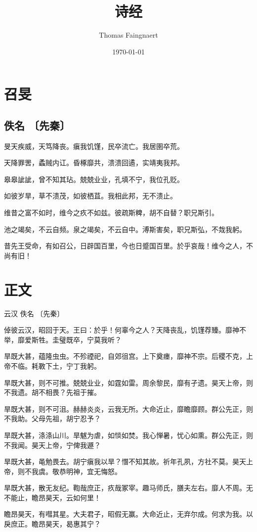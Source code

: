 \documentclass[a4paper,11pt]{article}
\title{诗经}
\author{Thomas Faingnaert}
\date{\today}
\begin{document}
\section{召旻}
\subsection{佚名 〔先秦〕}

		{\notosa 旻天疾威，天笃降丧。瘨我饥馑，民卒流亡。我居圉卒荒。}

		{\notosb 天降罪罟，蟊贼内讧。昏椓靡共，溃溃回遹，实靖夷我邦。}

		{\notosc 皋皋訿訿，曾不知其玷。兢兢业业，孔填不宁，我位孔贬。}

		{\notosd 如彼岁旱，草不溃茂，如彼栖苴。我相此邦，无不溃止。}

		{\notose 维昔之富不如时，维今之疚不如兹。彼疏斯粺，胡不自替？职兄斯引。}

		{\notosf 池之竭矣，不云自频。泉之竭矣，不云自中。溥斯害矣，职兄斯弘，不烖我躬。}

		{\notosg 昔先王受命，有如召公，日辟国百里，今也日蹙国百里。於乎哀哉！维今之人，不尚有旧！}

		\section{正文}

		云汉
		佚名 〔先秦〕

		倬彼云汉，昭回于天。王曰：於乎！何辜今之人？天降丧乱，饥馑荐臻。靡神不举，靡爱斯牲。圭璧既卒，宁莫我听？

		旱既大甚，蕴隆虫虫。不殄禋祀，自郊徂宫。上下奠瘗，靡神不宗。后稷不克，上帝不临。耗斁下土，宁丁我躬。

		旱既大甚，则不可推。兢兢业业，如霆如雷。周余黎民，靡有孑遗。昊天上帝，则不我遗。胡不相畏？先祖于摧。

		旱既大甚，则不可沮。赫赫炎炎，云我无所。大命近止，靡瞻靡顾。群公先正，则不我助。父母先祖，胡宁忍予？

		旱既大甚，涤涤山川。旱魃为虐，如惔如焚。我心惮暑，忧心如熏。群公先正，则不我闻。昊天上帝，宁俾我遯？

		旱既大甚，黾勉畏去。胡宁瘨我以旱？憯不知其故。祈年孔夙，方社不莫。昊天上帝，则不我虞。敬恭明神，宜无悔怒。

		旱既大甚，散无友纪。鞫哉庶正，疚哉冢宰。趣马师氏，膳夫左右。靡人不周。无不能止，瞻昂昊天，云如何里！

		瞻昂昊天，有嘒其星。大夫君子，昭假无赢。大命近止，无弃尔成。何求为我。以戾庶正。瞻昂昊天，曷惠其宁？
\end{document}
